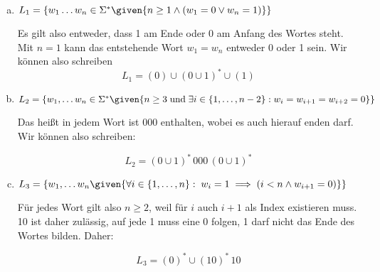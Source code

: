 \begin{enumerate}[a)]
\item $L_1 = \{ w_1 \ldots w_n \in \Sigma^{*} \given{n\geq 1 \land (w_1 = 0 \lor w_n = 1)} \} $

Es gilt also entweder, dass 1 am Ende oder 0 am Anfang des Wortes steht. Mit $n=1$ kann das entstehende Wort $w_1 = w_n$ entweder 0 oder 1 sein. Wir können also schreiben
\[ L_1 = (0) \cup (0 \cup 1)^{*} \cup (1) \]

\item $L_2 = \{w_1, \ldots w_n \in \Sigma^{*} \given{n\geq 3 \; \text{und} \; \exists i \in \{ 1, \ldots, n-2 \} : w_i = w_{i+1} = w_{i+2} = 0 } \}$

Das heißt in jedem Wort ist 000 enthalten, wobei es auch hierauf enden darf. Wir können also schreiben:

\[ L_2 = (0 \cup 1)^{*} \, 000 \, (0 \cup 1)^{*} \]

\item $ L_3 = \{ w_1, \ldots w_n \given{ \forall i \in \{1, \ldots, n\}: \; w_i = 1 \implies (i<n \land w_{i+1} = 0) } \} $

Für jedes Wort gilt also $n \geq 2$, weil für $i$ auch $i+1$ als Index existieren muss. 10 ist daher zulässig, auf jede 1 muss eine 0 folgen, 1 darf nicht das Ende des Wortes bilden. Daher:

\[ L_3 = (0)^{*} \cup (10)^{*} \, 10  \]

\end{enumerate}




